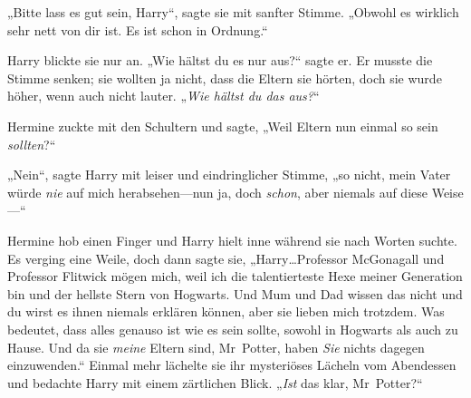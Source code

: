 „Bitte lass es gut sein, Harry“, sagte sie mit sanfter Stimme. „Obwohl es wirklich sehr nett von dir ist. Es ist schon in Ordnung.“

Harry blickte sie nur an. „Wie hältst du es nur aus?“ sagte er. Er musste die Stimme senken; sie wollten ja nicht, dass die Eltern sie hörten, doch sie wurde höher, wenn auch nicht lauter. „\emph{Wie hältst du das aus?}“

Hermine zuckte mit den Schultern und sagte, „Weil Eltern nun einmal so sein \emph{sollten}?“

„Nein“, sagte Harry mit leiser und eindringlicher Stimme, „so nicht, mein Vater würde \emph{nie} auf mich herabsehen—nun ja, doch \emph{schon}, aber niemals auf diese Weise—“

Hermine hob einen Finger und Harry hielt inne während sie nach Worten suchte. Es verging eine Weile, doch dann sagte sie, „Harry…Professor McGonagall und Professor Flitwick mögen mich, weil ich die talentierteste Hexe meiner Generation bin und der hellste Stern von Hogwarts. Und Mum und Dad wissen das nicht und du wirst es ihnen niemals erklären können, aber sie lieben mich trotzdem. Was bedeutet, dass alles genauso ist wie es sein sollte, sowohl in Hogwarts als auch zu Hause. Und da sie \emph{meine} Eltern sind, Mr~Potter, haben \emph{Sie} nichts dagegen einzuwenden.“ Einmal mehr lächelte sie ihr mysteriöses Lächeln vom Abendessen und bedachte Harry mit einem zärtlichen Blick. „\emph{Ist} das klar, Mr~Potter?“

